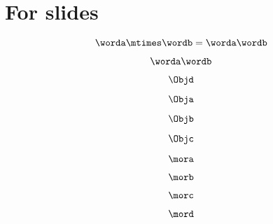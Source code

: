 
\section[For slides]{For slides}


\begin{forslides}

\begin{equation}
            \label{eq:string-semigroup-wordab-2}
            \worda \mtimes  \wordb =  \worda \wordb
        \end{equation}

        \begin{equation}
            \label{eq:string-semigroup-wordab-concat-2}
            \worda \wordb
        \end{equation}

        \begin{equation}
            \label{eq:00}
            \Objd
        \end{equation}

        \begin{equation}
            \label{eq:01}
            \Obja
        \end{equation}

        \begin{equation}
            \label{eq:02}
            \Objb
        \end{equation}

        \begin{equation}
            \label{eq:03}
            \Objc
        \end{equation}

        \begin{equation}
            \label{eq:04}
            \mora
        \end{equation}

        \begin{equation}
            \label{eq:05}
            \morb
        \end{equation}

        \begin{equation}
            \label{eq:06}
            \morc
        \end{equation}

        \begin{equation}
            \label{eq:07}
            \mord
        \end{equation}


\end{forslides}
